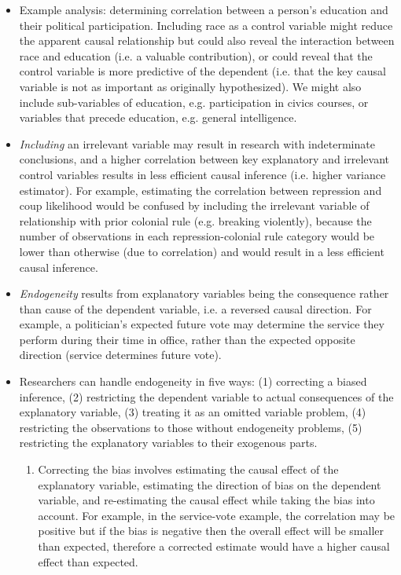 \documentclass[11pt,letterpaper]{article}
\begin{document}
\begin{itemize}
\item Example analysis: determining correlation between a person's education and their political participation. Including race as a control variable might reduce the apparent causal relationship but could also reveal the interaction between race and education (i.e. a valuable contribution), or could reveal that the control variable is more predictive of the dependent (i.e. that the key causal variable is not as important as originally hypothesized). We might also include sub-variables of education, e.g. participation in civics courses, or variables that precede education, e.g. general intelligence. 
\item \emph{Including} an irrelevant variable may result in research with indeterminate conclusions, and a higher correlation between key explanatory and irrelevant control variables results in less efficient causal inference (i.e. higher variance estimator). For example, estimating the correlation between repression and coup likelihood would be confused by including the irrelevant variable of relationship with prior colonial rule (e.g. breaking violently), because the number of observations in each repression-colonial rule category would be lower than otherwise (due to correlation) and would result in a less efficient causal inference.
\item \emph{Endogeneity} results from explanatory variables being the consequence rather than cause of the dependent variable, i.e. a reversed causal direction. For example, a politician's expected future vote may determine the service they perform during their time in office, rather than the expected opposite direction (service determines future vote).
\item Researchers can handle endogeneity in five ways: (1) correcting a biased inference, (2) restricting the dependent variable to actual consequences of the explanatory variable, (3) treating it as an omitted variable problem, (4) restricting the observations to those without endogeneity problems, (5) restricting the explanatory variables to their exogenous parts.
\begin{enumerate}
\item Correcting the bias involves estimating the causal effect of the explanatory variable, estimating the direction of bias on the dependent variable, and re-estimating the causal effect while taking the bias into account. For example, in the service-vote example, the correlation may be positive but if the bias is negative then the overall effect will be smaller than expected, therefore a corrected estimate would have a higher causal effect than expected.

\end{enumerate}
\end{itemize}
\end{document}

